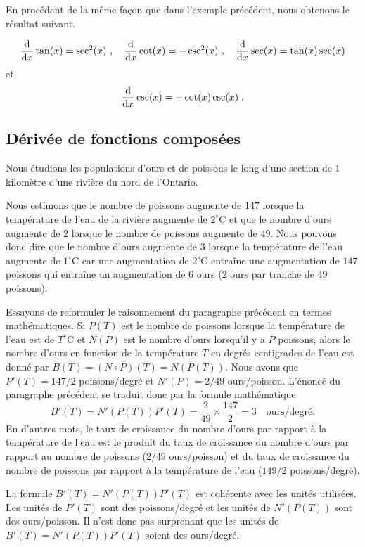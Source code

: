 {En procédant de la même façon que dans l'exemple précédent, nous
obtenons le résultat suivant.

\begin{prop}
\[
\dfdx{\tan(x)}{x} = \sec^2(x) \ ,
\quad \dfdx{\cot(x)}{x} = -\csc^2(x) \ ,
\quad \dfdx{\sec(x)}{x} = \tan(x) \sec(x)
\]
et
\[
\dfdx{\csc(x)}{x} = -\cot(x) \csc(x) \; .
\]
\end{prop}

\subsection{Dérivée de fonctions composées}

\begin{egg}
Nous étudions les populations d'ours et de poissons le long d'une section
de $1$ kilomètre d'une rivière du nord de l'Ontario.

Nous estimons que le nombre de poissons augmente de $147$ lorsque la
température de l'eau de la rivière augmente de $2^\circ$C et que le
nombre d'ours augmente de $2$ lorsque le nombre de poissons augmente
de $49$.  Nous pouvons donc dire que le nombre d'ours augmente de $3$
lorsque la température de l'eau augmente de $1^\circ$C car une
augmentation de $2^\circ$C entraîne une augmentation de $147$ poissons
qui entraîne un augmentation de $6$ ours ($2$ ours par tranche de $49$
poissons).

Essayons de reformuler le raisonnement du paragraphe précédent en
termes mathématiques.  Si $P(T)$ est le nombre de poissons lorsque la
température de l'eau est de $T^\circ$C et $N(P)$ est le nombre d'ours
lorsqu'il y a $P$ poissons, alors le nombre d'ours en fonction de la
température $T$ en degrés centigrades de l'eau est donné par
$B(T) = (N\circ P)(T) = N(P(T))$.   Nous avons que $P'(T) = 147/2$
poissons/degré et $N'(P) = 2/49$ ours/poisson.  L'énoncé du paragraphe
précédent se traduit donc par la formule mathématique
\[
B'(T) = N'(P(T)) P'(T) = \frac{2}{49} \times \frac{147}{2} = 3
\quad \text{ours/degré} .
\]
En d'autres mots, le taux de croissance du nombre d'ours par rapport à
la température de l'eau est le produit du taux de croissance du nombre
d'ours par rapport au nombre de poissons ($2/49$ ours/poisson) et du
taux de croissance du nombre de poissons par rapport à la température
de l'eau ($149/2$ poissons/degré).

La formule $B'(T) = N'(P(T)) P'(T)$ est cohérente avec les
unités utilisées.  Les unités de $P'(T)$ sont des poissons/degré et
les unités de $N'(P(T))$ sont des ours/poisson.  Il n'est donc pas 
surprenant que les unités de $B'(T) = N'(P(T)) P'(T)$ soient
des ours/degré.
\end{egg}

}
